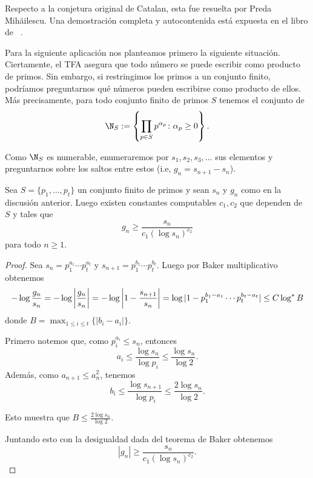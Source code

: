 \documentclass[11pt, reqno]{amsart}
\begin{document}
Respecto a la conjetura original de Catalan, esta fue resuelta por Preda Mih\u ailescu.
Una demostración completa y autocontenida está expuesta en el libro de \citeauthor{bilu:catalan}~\cite{bilu:catalan}.

Para la siguiente aplicación nos planteamos primero la siguiente situación. Ciertamente, el TFA asegura que todo número se puede escribir como producto de primos. Sin embargo, si restringimos los primos a un conjunto finito, podríamos preguntarnos qué números pueden escribirse como producto de ellos. Más precisamente, para todo conjunto finito de primos $S$ tenemos el conjunto de $$\N_S:=\left\{\prod_{p\in S}p^{\alpha_p}\colon \alpha_p\geq 0\right\}.$$

Como $\N_S$ es numerable, enumeraremos por $s_1,s_2,s_3,\ldots$ sus elementos y preguntarnos sobre los saltos entre estos (i.e, $g_n=s_{n+1}-s_n$).

\begin{prop}
	Sea $S=\{p_1,\ldots,p_t\}$ un conjunto finito de primos y sean $s_n$ y $g_n$ como en la discusión anterior. Luego existen constantes computables $c_1,c_2$ que dependen de $S$ y tales que $$g_n\geq \frac{s_n}{c_1(\log s_n)^{c_2}}$$ para todo $n\geq 1$. 
\end{prop}
\begin{proof}
	Sea $s_n=p_1^{a_1}\cdots p_t^{a_t}$ y $s_{n+1}=p_1^{b_1}\cdots p_t^{b_t}$. Luego por Baker multiplicativo obtenemos $$-\log\frac{g_n}{s_n}=-\log\left|\frac{g_n}{s_n}\right|=-\log\left|1-\frac{s_{n+1}}{s_n}\right|=\-\log|1-p_1^{b_1-a_1}\cdots p_t^{b_t-a_t}|\leq C\log^*B$$ donde $B=\max_{1\leq i\leq t}\{|b_i-a_i|\}$.

	Primero notemos que, como $p_i^{a_i}\leq s_n$, entonces $$a_i\leq \frac{\log{s_n}}{\log{p_i}}\leq\frac{\log s_n}{\log 2}.$$
	Además, como $a_{n+1}\leq a_n^2$, tenemos $$b_i\leq \frac{\log s_{n+1}}{\log p_i}\leq\frac{2\log s_{n}}{\log 2}.$$ 

	Esto muestra que $B\leq \frac{2\log s_n}{\log 2}$.

	Juntando esto con la desigualdad dada del teorema de Baker obtenemos $$|g_n|\geq \frac{s_n}{c_1(\log s_n)^{c_2}}.$$
\end{proof}
\end{document}
